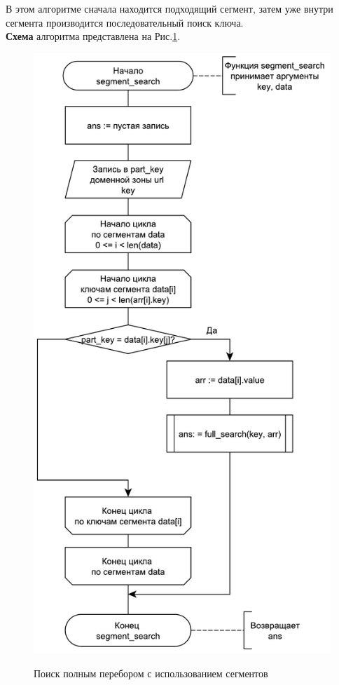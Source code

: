 В этом алгоритме сначала находится подходящий сегмент, затем уже внутри сегмента производится последовательный поиск ключа.\\

\textbf{Схема} алгоритма представлена на Рис.\ref{fig4:image}.

\begin{figure}[pt!]
	\begin{center}
		{\includegraphics[scale = 0.6]{schemes/segments}}
		\caption{Поиск полным перебором с использованием сегментов}
		\label{fig4:image}
	\end{center}
\end{figure}

